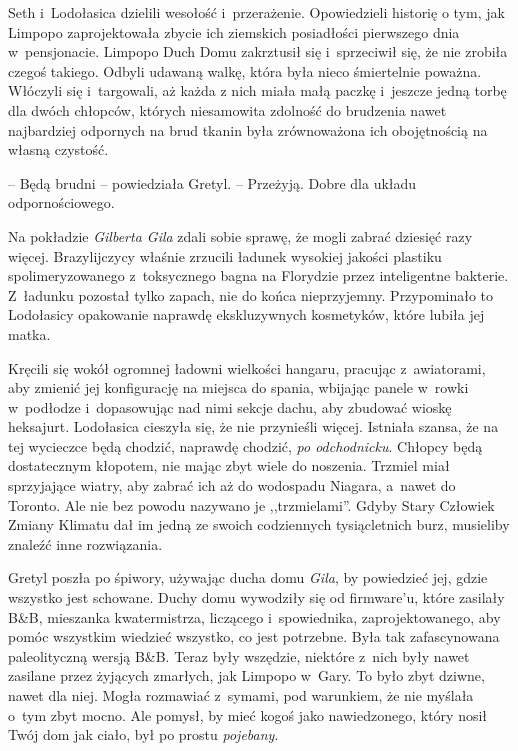 \documentclass[oneside,polish,11pt,sfheadings]{mwbk}
\begin{document}
Seth i~Lodołasica dzielili wesołość i~przerażenie. Opowiedzieli historię
o tym, jak Limpopo zaprojektowała zbycie ich ziemskich posiadłości
pierwszego dnia w~pensjonacie. Limpopo Duch Domu zakrztusił się i~sprzeciwił się, że nie zrobiła czegoś takiego. Odbyli udawaną walkę,
która była nieco śmiertelnie poważna. Włóczyli się i~targowali, aż każda
z nich miała małą paczkę i~jeszcze jedną torbę dla dwóch chłopców,
których niesamowita zdolność do brudzenia nawet najbardziej odpornych na
brud tkanin była zrównoważona ich obojętnością na własną czystość.

-- Będą brudni -- powiedziała Gretyl. -- Przeżyją. Dobre dla układu
odpornościowego.

Na pokładzie \textit{Gilberta Gila} zdali sobie sprawę, że mogli zabrać
dziesięć razy więcej. Brazylijczycy właśnie zrzucili ładunek wysokiej
jakości plastiku spolimeryzowanego z~toksycznego bagna na Florydzie
przez inteligentne bakterie. Z~ładunku pozostał tylko zapach, nie do
końca nieprzyjemny. Przypominało to Lodołasicy opakowanie naprawdę
ekskluzywnych kosmetyków, które lubiła jej matka.

Kręcili się wokół ogromnej ładowni wielkości hangaru, pracując z~awiatorami, aby zmienić jej konfigurację na miejsca do spania, wbijając
panele w~rowki w~podłodze i~dopasowując nad nimi sekcje dachu, aby
zbudować wioskę heksajurt. Lodołasica cieszyła się, że nie przynieśli
więcej. Istniała szansa, że na tej wycieczce będą chodzić, naprawdę
chodzić, \textit{po odchodnicku}. Chłopcy będą dostatecznym kłopotem, nie
mając zbyt wiele do noszenia. Trzmiel miał sprzyjające wiatry, aby
zabrać ich aż do wodospadu Niagara, a~nawet do Toronto. Ale nie bez
powodu nazywano je ,,trzmielami''. Gdyby Stary Człowiek Zmiany Klimatu
dał im jedną ze swoich codziennych tysiącletnich burz, musieliby znaleźć
inne rozwiązania.

Gretyl poszła po śpiwory, używając ducha domu \textit{Gila}, by powiedzieć
jej, gdzie wszystko jest schowane. Duchy domu wywodziły się od
firmware'u, które zasilały B\&B, mieszanka kwatermistrza, liczącego i~spowiednika, zaprojektowanego, aby pomóc wszystkim wiedzieć wszystko, co
jest potrzebne. Była tak zafascynowana paleolityczną wersją B\&B. Teraz
były wszędzie, niektóre z~nich były nawet zasilane przez żyjących
zmarłych, jak Limpopo w~Gary. To było zbyt dziwne, nawet dla niej. Mogła
rozmawiać z~symami, pod warunkiem, że nie myślała o~tym zbyt mocno. Ale
pomysł, by mieć kogoś jako nawiedzonego, który nosił Twój dom jak ciało,
był po prostu \textit{pojebany}.
\end{document}
